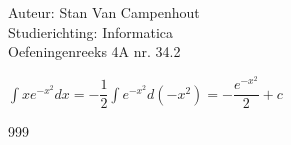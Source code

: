 \documentclass[a4paper]{article}
\begin{document}
  
\noindent \large Auteur: Stan Van Campenhout \\
\noindent \large Studierichting:  Informatica\\
\noindent \large Oefeningenreeks 4A nr. 34.2\\

\medskip

\normalsize

$ \displaystyle\int xe^{-x^2}dx = -\dfrac{1}{2}\displaystyle\int e^{-x^2}d\left(-x^2\right) = -\dfrac{e^{-x^2}}{2} + c $\\

\begin{thebibliography}{999}
\end{thebibliography}
\end{document}
